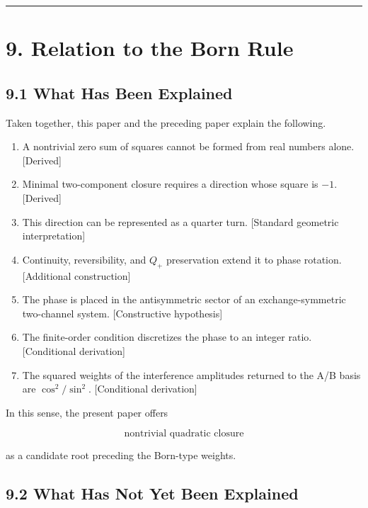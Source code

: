 \documentclass[
  a4paper,
  10pt]{article}
\providecommand{\tightlist}{%
  \setlength{\itemsep}{0pt}\setlength{\parskip}{0pt}}
\begin{document}
\begin{center}\rule{0.5\linewidth}{0.5pt}\end{center}

\section{9. Relation to the Born
Rule}\label{9-relation-to-the-born-rule}

\subsection{9.1 What Has Been
Explained}\label{91-what-has-been-explained}

Taken together, this paper and the preceding paper explain the
following.

\begin{enumerate}
\def\labelenumi{\arabic{enumi}.}
\tightlist
\item
  A nontrivial zero sum of squares cannot be formed from real numbers
  alone. {[}Derived{]}
\item
  Minimal two-component closure requires a direction whose square is
  \(-1\). {[}Derived{]}
\item
  This direction can be represented as a quarter turn. {[}Standard
  geometric interpretation{]}
\item
  Continuity, reversibility, and \(Q_+\) preservation extend it to phase
  rotation. {[}Additional construction{]}
\item
  The phase is placed in the antisymmetric sector of an
  exchange-symmetric two-channel system. {[}Constructive hypothesis{]}
\item
  The finite-order condition discretizes the phase to an integer ratio.
  {[}Conditional derivation{]}
\item
  The squared weights of the interference amplitudes returned to the A/B
  basis are \(\cos^2/\sin^2\). {[}Conditional derivation{]}
\end{enumerate}

In this sense, the present paper offers

\[
\text{nontrivial quadratic closure}
\]

as a candidate root preceding the Born-type weights.

\subsection{9.2 What Has Not Yet Been
Explained}\label{92-what-has-not-yet-been-explained}
\end{document}
